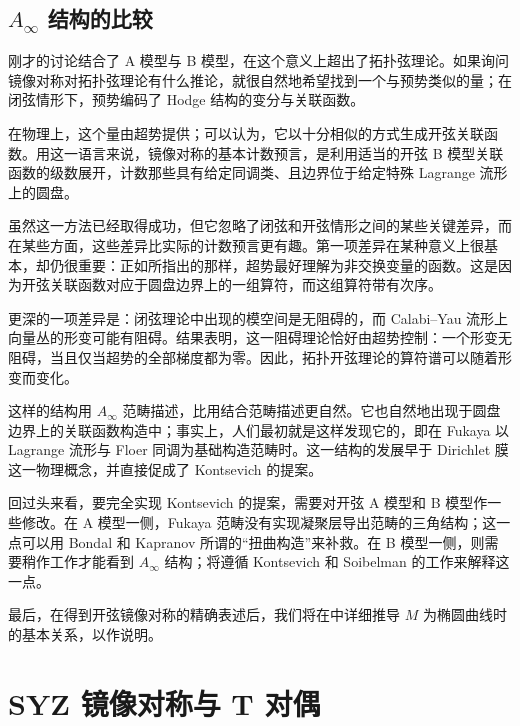 \subsection{\texorpdfstring{$A_\infty$}{A∞} 结构的比较}\label{sec:1.2.2}

刚才的讨论结合了 A 模型与 B 模型，在这个意义上超出了拓扑弦理论。如果询问镜像对称对拓扑弦理论有什么推论，就很自然地希望找到一个与预势类似的量；在闭弦情形下，预势编码了 Hodge 结构的变分与关联函数。

在物理上，这个量由超势提供；可以认为，它以十分相似的方式生成开弦关联函数。用这一语言来说，镜像对称的基本计数预言，是利用适当的开弦 B 模型关联函数的级数展开，计数那些具有给定同调类、且边界位于给定特殊 Lagrange 流形上的圆盘。

虽然这一方法已经取得成功，但它忽略了闭弦和开弦情形之间的某些关键差异，而在某些方面，这些差异比实际的计数预言更有趣。第一项差异在某种意义上很基本，却仍很重要：正如所指出的那样，超势最好理解为非交换变量的函数。这是因为开弦关联函数对应于圆盘边界上的一组算符，而这组算符带有次序。

更深的一项差异是：闭弦理论中出现的模空间是无阻碍的，而 Calabi--Yau 流形上向量丛的形变可能有阻碍。结果表明，这一阻碍理论恰好由超势控制：一个形变无阻碍，当且仅当超势的全部梯度都为零。因此，拓扑开弦理论的算符谱可以随着形变而变化。

这样的结构用 $A_\infty$ 范畴描述，比用结合范畴描述更自然。它也自然地出现于圆盘边界上的关联函数构造中；事实上，人们最初就是这样发现它的，即在 Fukaya 以 Lagrange 流形与 Floer 同调为基础构造范畴时。这一结构的发展早于 Dirichlet 膜这一物理概念，并直接促成了 Kontsevich 的提案。

回过头来看，要完全实现 Kontsevich 的提案，需要对开弦 A 模型和 B 模型作一些修改。在 A 模型一侧，Fukaya 范畴没有实现凝聚层导出范畴的三角结构；这一点可以用 Bondal 和 Kapranov 所谓的“扭曲构造”来补救。在 B 模型一侧，则需要稍作工作才能看到 $A_\infty$ 结构；将遵循 Kontsevich 和 Soibelman 的工作来解释这一点。

最后，在得到开弦镜像对称的精确表述后，我们将在中详细推导 $M$ 为椭圆曲线时的基本关系，以作说明。

\section{SYZ 镜像对称与 T 对偶}\label{sec:1.3}

